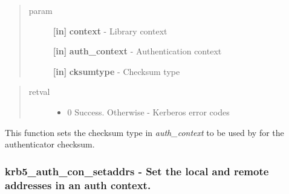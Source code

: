 \documentclass[letterpaper,10pt,english]{sphinxmanual}
\begin{document}
\begin{quote}\begin{description}
\item[{param}] \leavevmode
\textbf{{[}in{]}} \textbf{context} - Library context

\textbf{{[}in{]}} \textbf{auth\_context} - Authentication context

\textbf{{[}in{]}} \textbf{cksumtype} - Checksum type

\end{description}\end{quote}
\begin{quote}\begin{description}
\item[{retval}] \leavevmode\begin{itemize}
\item {} 
0   Success. Otherwise - Kerberos error codes

\end{itemize}

\end{description}\end{quote}

This function sets the checksum type in \emph{auth\_context} to be used by {\hyperref[appdev/refs/api/krb5_mk_req:krb5_mk_req]{}} for the authenticator checksum.


\subsubsection{krb5\_auth\_con\_setaddrs -  Set the local and remote addresses in an auth context.}
\label{appdev/refs/api/krb5_auth_con_setaddrs::doc}\label{appdev/refs/api/krb5_auth_con_setaddrs:krb5-auth-con-setaddrs-set-the-local-and-remote-addresses-in-an-auth-context}

\begin{fulllineitems}
\label{appdev/refs/api/krb5_auth_con_setaddrs:krb5_auth_con_setaddrs}
\end{fulllineitems}
\end{document}
